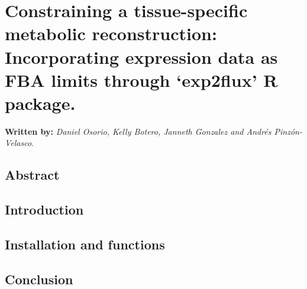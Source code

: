 \chapter{Constraining a tissue-specific metabolic reconstruction:  Incorporating expression data as FBA limits through `exp2flux' R package.}
\textbf{Written by:} \textit{Daniel Osorio, Kelly Botero,  Janneth Gonzalez and Andrés Pinzón-Velasco}.\\
\section*{Abstract}
\section{Introduction}
\section{Installation and functions}
\section{Conclusion}